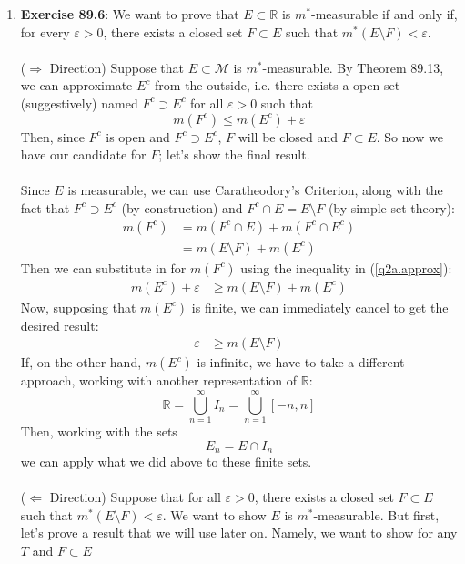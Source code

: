 \documentclass[12pt]{article}
\theoremstyle{plain}
\theoremstyle{definition}
\theoremstyle{remark}
\begin{document}
\begin{enumerate}
\begin{enumerate}
\item \textbf{Exercise 89.6}: We want to prove that $E\subset \mathbb{R}$ is $m^*$-measurable if and only if, for every $\varepsilon>0$, there exists a closed set $F\subset E$ such that $m^*(E\setminus F)< \varepsilon$.
\\
\\
($\Rightarrow$ Direction) Suppose that $E\subset \mathscr{M}$ is $m^*$-measurable. By Theorem 89.13, we can approximate $E^c$ from the outside, i.e. there exists a open set (suggestively) named $F^c\supset E^c$ for all $\varepsilon>0$ such that
\begin{equation}
    \label{q2a.approx}
    m(F^c) \leq m(E^c) + \varepsilon 
\end{equation}
Then, since $F^c$ is open and $F^c\supset E^c$, $F$ will be closed and $F \subset E$. So now we have our candidate for $F$; let's show the final result.
\\
\\
Since $E$ is measurable, we can use Caratheodory's Criterion, along with the fact that $F^c \supset E^c$ (by construction) and $F^c \cap E = E\setminus F$ (by simple set theory):
\begin{align*}
    m(F^c) &= m(F^c \cap E) + m(F^c \cap E^c)\\
    &= m(E\setminus F) + m(E^c)
\end{align*}
Then we can substitute in for $m(F^c)$ using the inequality in (\ref{q2a.approx}):
\begin{align*}
    m(E^c) + \varepsilon &\geq m(E\setminus F) + m(E^c)
\end{align*}
Now, supposing that $m(E^c)$ is finite, we can immediately cancel to get the desired result:
\begin{align*}
    \varepsilon &\geq m(E\setminus F) 
\end{align*}
If, on the other hand, $m(E^c)$ is infinite, we have to take a different approach, working with another representation of $\mathbb{R}$:
\[
    \mathbb{R} = \bigcup^\infty_{n=1} I_n = \bigcup^\infty_{n=1} [-n,n]
\]
Then, working with the sets
\[
    E_n = E \cap I_n 
\]
we can apply what we did above to these finite sets.
\\
\\
($\Leftarrow$ Direction) Suppose that for all $\varepsilon>0$, there exists a closed set $F\subset E$ such that $m^*(E\setminus F)<\varepsilon$. We want to show $E$ is $m^*$-measurable. But first, let's prove a result that we will use later on. Namely, we want to show for any $T$ and $F\subset E$

\end{enumerate}
\end{enumerate}
\end{document}
